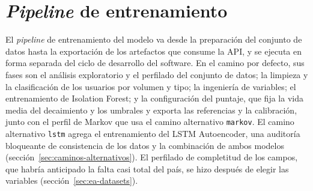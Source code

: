 \section{\emph{Pipeline} de entrenamiento}
El \emph{pipeline} de entrenamiento del modelo va desde la preparación del conjunto de datos
hasta la exportación de los artefactos que consume la API, y se ejecuta en forma separada del
ciclo de desarrollo del software. En el camino por defecto, sus fases son el análisis
exploratorio y el perfilado del conjunto de datos; la limpieza y la clasificación de los usuarios
por volumen y tipo; la ingeniería de variables; el entrenamiento de Isolation Forest; y la
configuración del puntaje, que fija la vida media del decaimiento y los umbrales y exporta las
referencias y la calibración, junto con el perfil de Markov que usa el camino alternativo
\texttt{markov}. El camino alternativo \texttt{lstm} agrega el
entrenamiento del LSTM Autoencoder, una auditoría bloqueante de consistencia de los datos y la
combinación de ambos modelos (sección~\ref{sec:caminos-alternativos}). El perfilado de completitud de los campos, que habría anticipado la falta casi total del país, se hizo después de elegir las variables (sección~\ref{sec:ea-datasets}).
